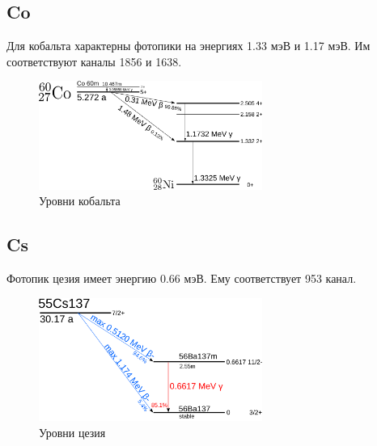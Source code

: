 \documentclass[a4paper,12pt]{article} %
\begin{document}
		\subsection*{Co}
			Для кобальта характерны фотопики на энергиях 1.33 мэВ и 1.17 мэВ.
			Им соответствуют каналы 1856 и 1638.
			\begin{figure}[h!]
				\includegraphics[width=0.65\textwidth]{img/Cobalt-60m-decay.png}
				\centering
				\caption{Уровни кобальта}
			\end{figure}\par
	\newpage
		\subsection*{Cs}
			Фотопик цезия имеет энергию 0.66 мэВ. 
			Ему соответствует 953 канал.
			\begin{figure}[h!]
				\includegraphics[width=0.65\textwidth]{img/Cs-137-decay.png}
				\centering
				\caption{Уровни цезия}
			\end{figure}\par
		
\end{document}
